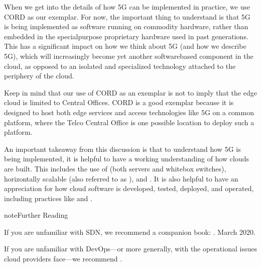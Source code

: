 \documentclass[a4paper,11pt,english]{sphinxmanual}
\begin{document}
\sphinxAtStartPar
When we get into the details of how 5G can be implemented in practice,
we use CORD as our exemplar. For now, the important thing to understand
is that 5G is being implemented as software running on commodity
hardware, rather than embedded in the special\sphinxhyphen{}purpose proprietary
hardware used in past generations. This has a significant impact on how
we think about 5G (and how we describe 5G), which will increasingly
become yet another software\sphinxhyphen{}based component in the cloud, as opposed to
an isolated and specialized technology attached to the periphery of the
cloud.

\sphinxAtStartPar
Keep in mind that our use of CORD as an exemplar is not to imply that
the edge cloud is limited to Central Offices. CORD is a good exemplar
because it is designed to host both edge services and access
technologies like 5G on a common platform, where the Telco Central
Office is one possible location to deploy such a platform.

\sphinxAtStartPar
An important takeaway from this discussion is that to understand how 5G
is being implemented, it is helpful to have a working understanding of
how clouds are built. This includes the use of 
(both servers and white\sphinxhyphen{}box switches), horizontally scalable
 (also referred to as ), and
. It is also helpful to have an
appreciation for how cloud software is developed, tested, deployed, and
operated, including practices like  and .

\label{\detokenize{intro:reading-devops}}
\begin{sphinxadmonition}{note}{Further Reading}

\sphinxAtStartPar
If you are unfamiliar with SDN, we recommend a companion book:
. March 2020.

\sphinxAtStartPar
If you are unfamiliar with DevOps—or more generally, with the
operational issues cloud providers face—we recommend .
\end{sphinxadmonition}
\end{document}
